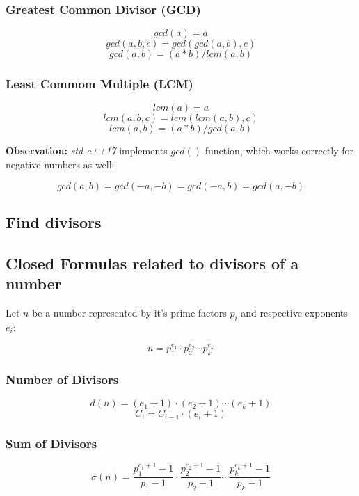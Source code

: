 	\subsubsection{Greatest Common Divisor (GCD)}
	
		$$ gcd(a) = a $$
		$$ gcd(a, b, c) = gcd( gcd(a, b), c ) $$ 
		$$ gcd(a, b) = (a*b) / lcm(a, b) $$
	
	\subsubsection{Least Commom Multiple (LCM)}
	
		$$ lcm(a) = a $$
		$$ lcm(a, b, c) = lcm( lcm(a, b), c ) $$
		$$ lcm(a, b) = (a*b) / gcd(a, b) $$
	
	\textbf{Observation:} \textit{std-c++17} implements $gcd()$ function, which works correctly for negative numbers as well:
	
	$$ gcd(a,b) = gcd(-a,-b) = gcd(-a,b) = gcd(a,-b) $$
	
\subsection{Find divisors}


\subsection{Closed Formulas related to divisors of a number}
	
	Let $n$ be a number represented by it's prime factors $p_i$ and respective exponents $e_i$:
	
	$$ n = p_1^{e_1} \cdot p_2^{e_2} \cdots p_k^{e_k} $$
	
	\subsubsection{Number of Divisors}
	
	$$ d(n) = (e_1 + 1) \cdot (e_2 + 1) \cdots (e_k + 1) $$
	$$ C_i = C_{i-1} \cdot (e_i + 1) $$
	
	\subsubsection{Sum of Divisors}
	
	$$ \sigma(n) = \frac{p_1^{e_1 + 1} - 1}{p_1 - 1} \cdot \frac{p_2^{e_2 + 1} - 1}{p_2 - 1} \cdots \frac{p_k^{e_k + 1} - 1}{p_k - 1} $$
	

